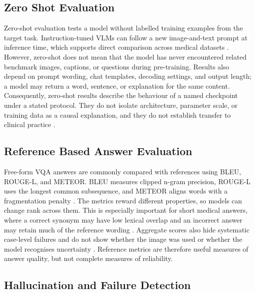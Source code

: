 \subsection{Zero Shot Evaluation}

Zero-shot evaluation tests a model without labelled training examples from the target task. Instruction-tuned VLMs can follow a new image-and-text prompt at inference time, which supports direct comparison across medical datasets \citep{liu2023visualinstruction,bai2023qwenvl}. However, zero-shot does not mean that the model has never encountered related benchmark images, captions, or questions during pre-training. Results also depend on prompt wording, chat templates, decoding settings, and output length; a model may return a word, sentence, or explanation for the same content. Consequently, zero-shot results describe the behaviour of a named checkpoint under a stated protocol. They do not isolate architecture, parameter scale, or training data as a causal explanation, and they do not establish transfer to clinical practice \citep{li2023llavamed,sellergren2025medgemma}.

\subsection{Reference Based Answer Evaluation}

Free-form VQA answers are commonly compared with references using BLEU, ROUGE-L, and METEOR. BLEU measures clipped n-gram precision, ROUGE-L uses the longest common subsequence, and METEOR aligns words with a fragmentation penalty \citep{papineni2002bleu,lin2004rouge,banerjee2005meteor}. The metrics reward different properties, so models can change rank across them. This is especially important for short medical answers, where a correct synonym may have low lexical overlap and an incorrect answer may retain much of the reference wording \citep{lau2018vqarad,he2020pathvqa}. Aggregate scores also hide systematic case-level failures and do not show whether the image was used or whether the model recognises uncertainty \citep{ribeiro2020checklist}. Reference metrics are therefore useful measures of answer quality, but not complete measures of reliability.

\subsection{Hallucination and Failure Detection}

